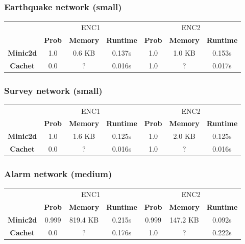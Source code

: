 \subsubsection{Earthquake network (small)}
\begin{table}[H]
    \centering
    \begin{tabular}{c|c|c|c|c|c|c|}
    \cline{2-7}
            & \multicolumn{3}{c|}{ENC1} & \multicolumn{3}{c|}{ENC2} \\ \cline{2-7}
      & \textbf{Prob}  & \textbf{Memory}  & \textbf{Runtime} & \textbf{Prob}  & \textbf{Memory}  & \textbf{Runtime} \\ \cline{1-7}
      \textbf{Minic2d} & 1.0  & 0.6 KB & 0.137s   & 1.0    & 1.0 KB  & 	0.153s \\
      \hline
    \textbf{Cachet}  & 0.0  & ?    & 0.016s       & 1.0     & ?    & 0.017s    \\ \cline{1-7}
    \end{tabular}
\end{table}

\subsubsection{Survey network (small)}
\begin{table}[H]
\centering
    \begin{tabular}{c|c|c|c|c|c|c|}
    \cline{2-7}
            & \multicolumn{3}{c|}{ENC1} & \multicolumn{3}{c|}{ENC2} \\ \cline{2-7}
      & \textbf{Prob}  & \textbf{Memory}  & \textbf{Runtime} & \textbf{Prob}  & \textbf{Memory}  & \textbf{Runtime} \\ \cline{1-7}
      \textbf{Minic2d} & 1.0  & 1.6 KB    & 0.125s   & 1.0    & 2.0 KB    & 	0.125s \\
      \hline
    \textbf{Cachet}  & 0.0  & ?    & 0.016s       & 1.0     & ?    & 0.016s    \\ \cline{1-7}
    \end{tabular}
\end{table}

\subsubsection{Alarm network (medium)}
\begin{table}[H]
    \centering
    \begin{tabular}{c|c|c|c|c|c|c|}
    \cline{2-7}
            & \multicolumn{3}{c|}{ENC1} & \multicolumn{3}{c|}{ENC2} \\ \cline{2-7}
      & \textbf{Prob}  & \textbf{Memory}  & \textbf{Runtime} & \textbf{Prob}  & \textbf{Memory}  & \textbf{Runtime} \\ \cline{1-7}
      \textbf{Minic2d} & 0.999  & 819.4 KB    & 0.215s   & 0.999    & 147.2 KB    & 	0.092s \\
      \hline
    \textbf{Cachet}  & 0.0  & ?    & 0.176s       & 1.0     & ?    & 0.222s    \\ \cline{1-7}
\end{tabular}
\end{table}

